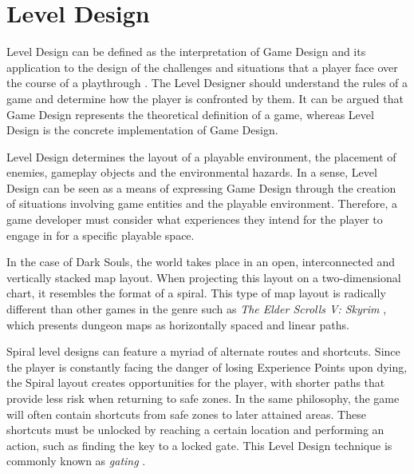
\section{Level Design}
\label{sec:level-design-dark-souls}

Level Design can be defined as the interpretation of Game Design and its application to the design of the challenges and situations that a player face over the course of a playthrough \cite{BOOK_LevelDesignConcept}. The Level Designer should understand the rules of a game and determine how the player is confronted by them. It can be argued that Game Design represents the theoretical definition of a game, whereas Level Design is the concrete implementation of Game Design.

Level Design determines the layout of a playable environment, the placement of enemies, gameplay objects and the environmental hazards. In a sense, Level Design can be seen as a means of expressing Game Design through the creation of situations involving game entities and the playable environment. Therefore, a game developer must consider what experiences they intend for the player to engage in for a specific playable space.


In the case of Dark Souls, the world takes place in an open, interconnected and vertically stacked map layout. When projecting this layout on a two-dimensional chart, it resembles the format of a spiral. This type of map layout is radically different than other games in the genre such as \emph{The Elder Scrolls V: Skyrim} , which presents dungeon maps as horizontally spaced and linear paths.

Spiral level designs can feature a myriad of alternate routes and shortcuts. Since the player is constantly facing the danger of losing Experience Points upon dying, the Spiral layout creates opportunities for the player, with shorter paths that provide less risk when returning to safe zones. In the same philosophy, the game will often contain shortcuts from safe zones to later attained areas. These shortcuts must be unlocked by reaching a certain location and performing an action, such as finding the key to a locked gate. This Level Design technique is commonly known as \emph{gating} \cite{BOOK_LevelUpTheGuideToGreat}.

